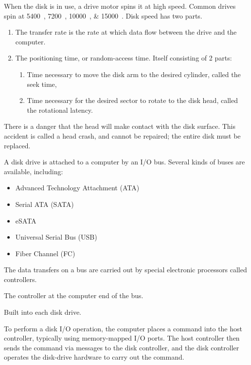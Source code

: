 When the disk is in use, a drive motor spins it at high speed.
Common drives spin at \SIlist{5400; 7200; 10000; 15000}{\rpm}.
Disk speed has two parts.
\begin{enumerate}[noitemsep]
\item The transfer rate is the rate at which data flow between the drive and the computer.
\item The positioning time, or random-access time. Itself consisting of 2 parts:
  \begin{enumerate}[noitemsep]
  \item Time necessary to move the disk arm to the desired cylinder, called the seek time,
  \item Time necessary for the desired sector to rotate to the disk head, called the rotational latency.
  \end{enumerate}
\end{enumerate}

There is a danger that the head will make contact with the disk surface.
This accident is called a head crash, and cannot be repaired; the entire disk must be replaced.

A disk drive is attached to a computer by an I/O bus.
Several kinds of buses are available, including:
\begin{itemize}[noitemsep]
\item Advanced Technology Attachment (ATA)
\item Serial ATA (SATA)
\item eSATA
\item Universal Serial Bus (USB)
\item Fiber Channel (FC)
\end{itemize}

The data transfers on a bus are carried out by special electronic processors called controllers.
\begin{description}[noitemsep]
\item[Host Controller:] The controller at the computer end of the bus.
\item[Disk Controller:] Built into each disk drive.
\end{description}

To perform a disk I/O operation, the computer places a command into the host controller, typically using memory-mapped I/O ports.
The host controller then sends the command via messages to the disk controller, and the disk controller operates the disk-drive hardware to carry out the command.


